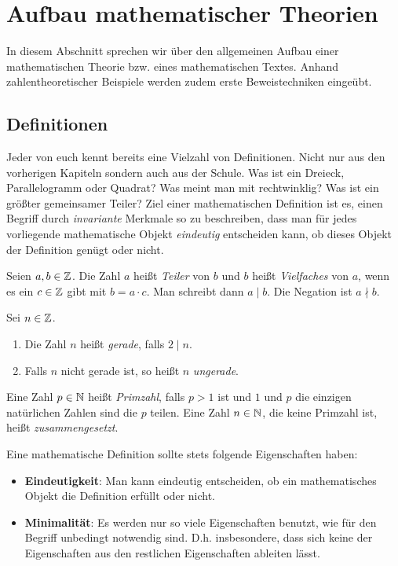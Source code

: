 \chapter{Aufbau mathematischer Theorien}

In diesem Abschnitt sprechen wir über den allgemeinen Aufbau einer mathematischen
Theorie bzw. eines mathematischen Textes.
Anhand zahlentheoretischer Beispiele werden zudem erste Beweistechniken eingeübt.

\section{Definitionen}

Jeder von euch kennt bereits eine Vielzahl von Definitionen.
Nicht nur aus den vorherigen Kapiteln sondern auch aus der Schule.
Was ist ein Dreieck, Parallelogramm oder Quadrat?
Was meint man mit rechtwinklig?
Was ist ein größter gemeinsamer Teiler?
Ziel einer mathematischen Definition ist es, einen Begriff durch
\textit{invariante} Merkmale so zu beschreiben, dass man für jedes vorliegende
mathematische Objekt \textit{eindeutig} entscheiden kann, ob dieses Objekt der
Definition genügt oder nicht.

\begin{mydef}
Seien $a,b \in \mathbb{Z}$.
Die Zahl $a$ heißt \textit{Teiler} von $b$ und $b$ heißt \textit{Vielfaches}
von $a$, wenn es ein $c \in \mathbb{Z}$ gibt mit $b = a \cdot c$.
Man schreibt dann $a \mid b$. Die Negation ist $a \nmid b$.
\end{mydef}

\begin{mydef}
Sei $n \in \mathbb{Z}$.
    \begin{enumerate}
        \item
        Die Zahl $n$ heißt \textit{gerade}, falls $2 \mid n$.
        \item
        Falls $n$ nicht gerade ist, so heißt $n$ \textit{ungerade}.
    \end{enumerate}
\end{mydef}

\begin{mydef}
Eine Zahl $p \in \mathbb{N}$ heißt \textit{Primzahl}, falls $p > 1$ ist und $1$ und
$p$ die einzigen natürlichen Zahlen sind die $p$ teilen.
Eine Zahl $n \in \mathbb{N}$, die keine Primzahl ist, heißt \textit{zusammengesetzt}.
\end{mydef}

Eine mathematische Definition sollte stets folgende Eigenschaften haben:
\begin{itemize}
    \item
    \textbf{Eindeutigkeit}: Man kann eindeutig entscheiden, ob ein mathematisches Objekt die Definition erfüllt oder nicht.
    \item
    \textbf{Minimalität}: Es werden nur so viele Eigenschaften benutzt, wie für den Begriff unbedingt notwendig sind.
    D.h. insbesondere, dass sich keine der Eigenschaften aus den restlichen Eigenschaften ableiten lässt.
\end{itemize}

